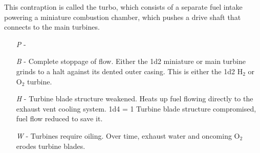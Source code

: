 \documentclass[a4paper]{article}
\begin{document}
This contraption is called the turbo, which consists of a separate fuel intake powering a miniature combustion chamber, which pushes a drive shaft that connects to the main turbines.
\begin{enumerate}
\item [\textit{P}] -  
\item [\textit{B}] -  Complete stoppage of flow. Either the 1d2 miniature or main turbine grinds to a halt against its dented outer casing. This is either the 1d2 H$_2$ or O$_2$ turbine.
\item [\textit{H}] - Turbine blade structure weakened. Heats up fuel flowing directly to the exhaust vent cooling system. \newline \hspace*{3pt} 1d4 = 1 Turbine blade structure compromised, fuel flow reduced to save it.
\item [\textit{W}] - Turbines require oiling. Over time, exhaust water and oncoming O$_2$ erodes turbine blades. 
\end{enumerate}
\end{document}
